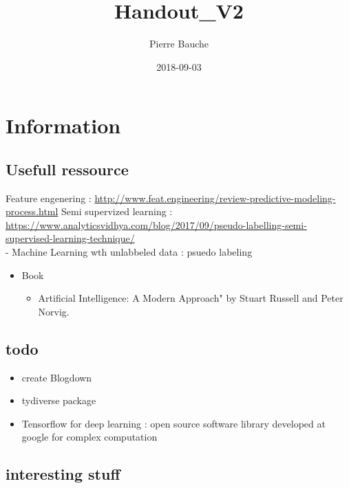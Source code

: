 \documentclass[]{book}
\title{Handout\_V2}
\author{Pierre Bauche}
\date{2018-09-03}
\providecommand{\tightlist}{%
  \setlength{\itemsep}{0pt}\setlength{\parskip}{0pt}}
\theoremstyle{definition}
\theoremstyle{definition}
\theoremstyle{definition}
\theoremstyle{remark}
\begin{document}
\maketitle

{
\setcounter{tocdepth}{1}
\tableofcontents
}
\chapter{\texorpdfstring{\textbf{Information}}{Information}}\label{information}

\section{Usefull ressource}\label{usefull-ressource}

Feature engenering :
\url{http://www.feat.engineering/review-predictive-modeling-process.html}
Semi supervized learning :
\url{https://www.analyticsvidhya.com/blog/2017/09/pseudo-labelling-semi-supervised-learning-technique/}\\
- Machine Learning wth unlabbeled data : psuedo labeling

\begin{itemize}
\tightlist
\item
  Book

  \begin{itemize}
  \tightlist
  \item
    Artificial Intelligence: A Modern Approach" by Stuart Russell and
    Peter Norvig.
  \end{itemize}
\end{itemize}

\section{todo}\label{todo}

\begin{itemize}
\tightlist
\item
  create Blogdown
\item
  tydiverse package
\item
  Tensorflow for deep learning : open source software library developed
  at google for complex computation
\end{itemize}

\section{interesting stuff}\label{interesting-stuff}
\end{document}
